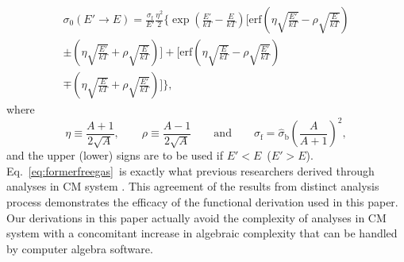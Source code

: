 \documentclass[review]{elsarticle}
\newcommand{\ekt}{\frac{E}{kT}}
\newcommand{\epkt}{\frac{E'}{kT}}
\newcommand{\erf}{\mathrm{erf}}
\begin{document}
\begin{multline}\label{eq:formerfreegas}
\sigma_0(E'\to E)  =\frac{\sigma_\mathrm{f}}{E'}\frac{\eta^2}{2}\Bigg\{\exp\left(\epkt-\ekt\right)\Bigg[\erf\left(\eta\sqrt{\epkt}-\rho\sqrt{\ekt}\right)\\
\pm\left(\eta\sqrt{\epkt}+\rho\sqrt{\ekt}\right)\Bigg]+\Bigg[\erf\left(\eta\sqrt{\ekt}-\rho\sqrt{\epkt}\right)\\
 \mp\left(\eta\sqrt{\ekt}+\rho\sqrt{\epkt}\right)\Bigg]\Bigg\},
\end{multline}
where
\begin{equation}
\eta\equiv\frac{A+1}{2\sqrt{A}},\qquad\rho\equiv\frac{A-1}{2\sqrt{A}}\qquad\mathrm{and}\qquad\sigma_\mathrm{f}=\hat{\sigma}_\mathrm{b}\left(\frac{A}{A+1}\right)^2,
\end{equation}
and the upper (lower) signs are to be used if $E'<E$~($E'>E$). Eq.~\eqref{eq:formerfreegas}~is exactly what previous researchers derived through analyses in CM system \cite{glasstone}. This agreement of the results from distinct analysis process demonstrates the efficacy of the functional derivation used in this paper. Our derivations in this paper actually avoid the complexity of analyses in CM system with a concomitant increase in algebraic complexity that can be handled by computer algebra software.
\end{document}
